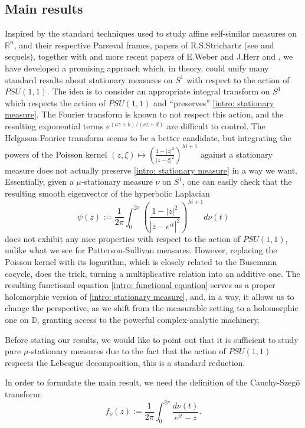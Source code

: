 \documentclass[11pt]{article}
\begin{document}
\subsection{Main results}
Inspired by the standard techniques used to study affine self-similar measures on $\mathbb{R}^n$, and their respective Parseval frames, papers of R.S.Strichartz (see \cite{strichartzI} and sequels), together with \cite{denseanalytic} and more recent papers of E.Weber and J.Herr \cite{weber2017paleywiener} and \cite{axioms6020007}, we have developed a promising approach which, in theory, could unify many standard results about stationary measures on $S^1$ with respect to the action of $PSU(1,1)$. The idea is to consider an appropriate integral transform on $S^1$ which respects the action of $PSU(1,1)$ and ``preserves'' \eqref{intro: stationary measure}. The Fourier transform is known to not respect this action, and the resulting exponential terms $e^{(az +b) / (cz+d)}$ are difficult to control. The Helgason-Fourier transform seems to be a better candidate, but integrating the powers of the Poisson kernel $(z, \xi) \mapsto \left( \frac{1 - |z|^2}{|z - \xi|^2}\right)^{\lambda i + 1}$ against a stationary measure does not actually preserve \eqref{intro: stationary measure} in a way we want. Essentially, given a $\mu$-stationary measure $\nu$ on $S^1$, one can easily check that the resulting smooth eigenvector of the hyperbolic Laplacian
\[
\psi(z) := \frac{1}{2\pi} \int_{0}^{2\pi} \left( \frac{1 - |z|^2}{|z - e^{i t}|^2}\right)^{\lambda i + 1} d\nu(t)
\]
does not exhibit any nice properties with respect to the action of $PSU(1,1)$, unlike what we see for Patterson-Sullivan measures. However, replacing the Poisson kernel with its logarithm, which is closely related to the Busemann cocycle, does the trick, turning a multiplicative relation into an additive one. The resulting functional equation \eqref{intro: functional equation} serves as a proper holomorphic version of \eqref{intro: stationary measure}, and, in a way, it allows us to change the perspective, as we shift from the measurable setting to a holomorphic one on $\mathbb{D}$, granting access to the powerful complex-analytic machinery.

Before stating our results, we would like to point out that it is sufficient to study pure $\mu$-stationary measures due to the fact that the action of $PSU(1,1)$ respects the Lebesgue decomposition, this is a standard reduction.

In order to formulate the main result, we need the definition of the Cauchy-Szeg\"{o} transform:
\[
f_\nu(z) := \frac{1}{2\pi} \int_{0}^{2\pi} \dfrac{d\nu(t)}{e^{it} - z}.
\]
\end{document}
